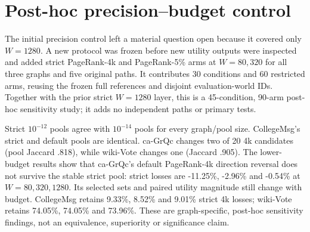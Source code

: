 \documentclass[smallextended]{svjour3}
\begin{document}
\section{Post-hoc precision--budget control}
The initial precision control left a material question open because it covered
only $W=1280$. A new protocol was frozen before new utility outputs were inspected
and added strict PageRank-4k and PageRank-5\% arms at $W=80,320$ for all three
graphs and five original paths. It contributes 30 conditions and 60 restricted
arms, reusing the frozen full references and disjoint evaluation-world IDs. Together
with the prior strict $W=1280$ layer, this is a 45-condition, 90-arm post-hoc
sensitivity study; it adds no independent paths or primary tests.

Strict $10^{-12}$ pools agree with $10^{-14}$ pools for every graph/pool size.
CollegeMsg's strict and default pools are identical. ca-GrQc changes two of 20
4k candidates (pool Jaccard .818), while wiki-Vote changes one (Jaccard .905).
The lower-budget results show that ca-GrQc's default PageRank-4k direction reversal
does not survive the stable strict pool: strict losses are -11.25\%, -2.96\% and
-0.54\% at $W=80,320,1280$. Its selected sets and paired utility magnitude still
change with budget. CollegeMsg retains 9.33\%, 8.52\% and 9.01\% strict 4k losses;
wiki-Vote retains 74.05\%, 74.05\% and 73.96\%. These are graph-specific,
post-hoc sensitivity findings, not an equivalence, superiority or significance claim.

\FloatBarrier
\end{document}
